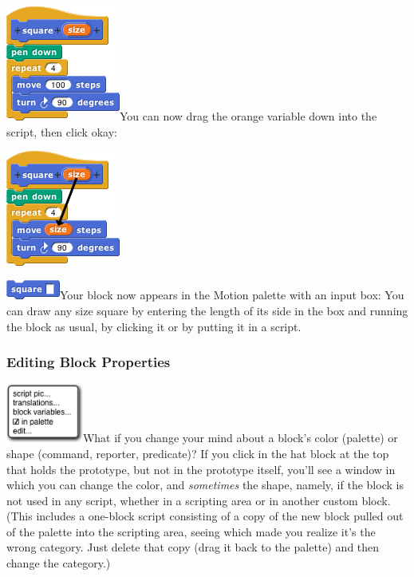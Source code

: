 \includegraphics[width=1.47917in,height=1.48958in]{media/image510.png}You
can now drag the orange variable down into the script, then click okay:

\includegraphics[width=1.47472in,height=1.4955in]{media/image511.png}

\includegraphics[width=0.69792in,height=0.25in]{media/image512.png}Your
block now appears in the Motion palette with an input box: You can draw
any size square by entering the length of its side in the box and
running the block as usual, by clicking it or by putting it in a script.

\subsubsection{Editing Block Properties}\label{editing-block-properties}

\includegraphics[width=0.99931in,height=0.76042in]{media/image513.png}What
if you change your mind about a block's color (palette) or shape
(command, reporter, predicate)? If you click in the hat block at the top
that holds the prototype, but not in the prototype itself, you'll see a
window in which you can change the color, and \emph{sometimes} the
shape, namely, if the block is not used in any script, whether in a
scripting area or in another custom block. (This includes a one-block
script consisting of a copy of the new block pulled out of the palette
into the scripting area, seeing which made you realize it's the wrong
category. Just delete that copy (drag it back to the palette) and then
change the category.)

